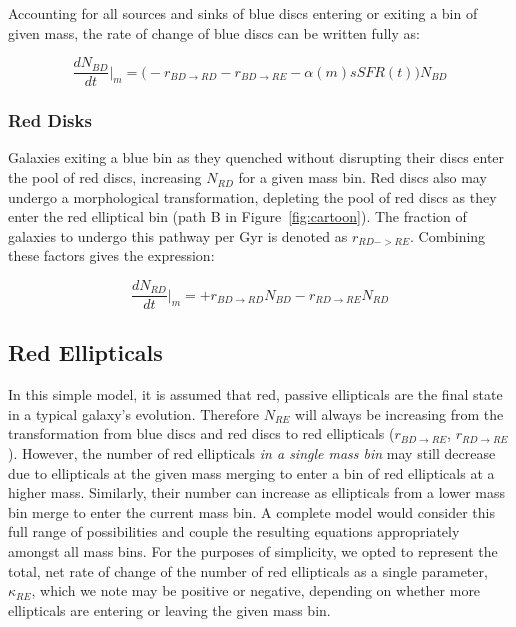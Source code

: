 \documentclass[useAMS,usenatbib]{mn2e}
\begin{document}
Accounting for all sources and sinks of blue discs entering or exiting a bin of given mass, the rate of change of blue discs can be written fully as:

\begin{equation}
\frac{dN_{BD}}{dt}\Big\rvert_{m} = \Big(-r_{BD \rightarrow RD} - r_{BD\rightarrow RE} -\alpha(m) sSFR(t) \Big)N_{BD}
\label{eqn:BD}
\end{equation}

\subsubsection{Red Disks}
Galaxies exiting a blue bin as they quenched without disrupting their discs enter the pool of red discs, increasing $N_{RD}$ for a given mass bin. Red discs also may undergo a morphological transformation, depleting the pool of red discs as they enter the red elliptical bin (path B in Figure~\ref{fig:cartoon}). The fraction of galaxies to undergo this pathway per Gyr is denoted as $r_{RD->RE}$. Combining these factors gives the expression: 

\begin{equation}
\frac{dN_{RD}}{dt}\Big\rvert_{m} = + r_{BD \rightarrow RD}N_{BD} - r_{RD \rightarrow RE}N_{RD}
\label{eqn:RD}
\end{equation}

\subsection{Red Ellipticals}
In this simple model, it is assumed that red, passive ellipticals are the final state in a typical galaxy's evolution. Therefore $N_{RE}$ will always be increasing from the transformation from blue discs and red discs to red ellipticals ($r_{BD \rightarrow RE}$, $r_{RD \rightarrow RE}$). However, the number of red ellipticals \emph{in a single mass bin} may still decrease due to ellipticals at the given mass merging to enter a bin of red ellipticals at a higher mass. Similarly, their number can increase as ellipticals from a lower mass bin merge to enter the current mass bin. A complete model would consider this full range of possibilities and couple the resulting equations appropriately amongst all mass bins. For the purposes of simplicity, we opted to represent the total, net rate of change of the number of red ellipticals as a single parameter, $\kappa_{RE}$, which we note may be positive or negative, depending on whether more ellipticals are entering or leaving the given mass bin. 
\end{document}
